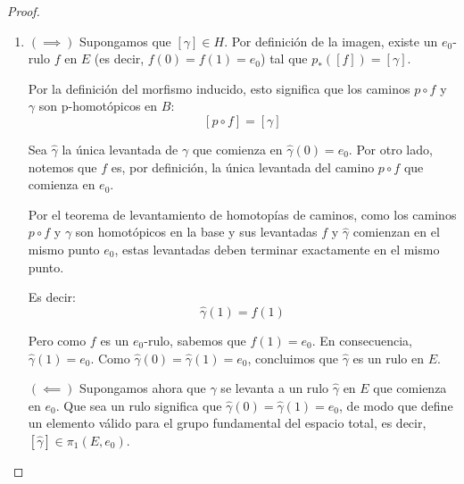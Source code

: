 \documentclass{article}
\theoremstyle{plain}
\theoremstyle{definition}
\begin{document}
\begin{proof}
\begin{enumerate}
              Finalmente, analicemos qué ocurre en el tiempo \( s=1 \). Por construcción, tenemos que \( p(\hat{H}(t,1)) = H(t,1) = b_0 \). Esto significa que el camino \( t \mapsto \hat{H}(t,1) \) es una levantada del camino constante \( c_{b_0} \) que comienza en \( \hat{H}(0,1) = e_0 \). Por la unicidad del levantamiento de caminos, la única levantada posible es el propio rulo constante en \( e_0 \), es decir, \( \hat{H}(t,1) = c_{e_0}(t) \).

              Por lo tanto, \( \hat{H} \) es una \( p \)-homotopía en \( E \) entre \( \gamma \) y \( c_{e_0} \), lo que demuestra que:
              \[ {[\gamma]} = [c_{e_0}] \]

              Como el único elemento en el núcleo es la clase de la identidad, concluimos que \( \ker(p_*) = \{ [c_{e_0}] \} \), lo que prueba que \( p_* \) es inyectiva y, por lo tanto, un monomorfismo.

        \item \( (\implies) \) Supongamos que \( [\gamma] \in H \). Por definición de la imagen, existe un \( e_0 \)-rulo \( f \) en \( E \) (es decir, \( f(0)=f(1)=e_0 \)) tal que \( p_*([f]) = [\gamma] \).

              Por la definición del morfismo inducido, esto significa que los caminos \( p \circ f \) y \( \gamma \) son p-homotópicos en \( B \):
              \[ {[p \circ f]} = [\gamma] \]

              Sea \( \hat{\gamma} \) la única levantada de \( \gamma \) que comienza en \( \hat{\gamma}(0) = e_0 \).
              Por otro lado, notemos que \( f \) es, por definición, la única levantada del camino \( p \circ f \) que comienza en \( e_0 \).

              Por el teorema de levantamiento de homotopías de caminos, como los caminos \( p \circ f \) y \( \gamma \) son homotópicos en la base y sus levantadas \( f \) y \( \hat{\gamma} \) comienzan en el mismo punto \( e_0 \), estas levantadas deben terminar exactamente en el mismo punto.

              Es decir:
              \[ \hat{\gamma}(1) = f(1) \]

              Pero como \( f \) es un \( e_0 \)-rulo, sabemos que \( f(1) = e_0 \). En consecuencia, \( \hat{\gamma}(1) = e_0 \).
              Como \( \hat{\gamma}(0) = \hat{\gamma}(1) = e_0 \), concluimos que \( \hat{\gamma} \) es un rulo en \( E \).

              \vspace{0.5cm}
              \( (\impliedby) \) Supongamos ahora que \( \gamma \) se levanta a un rulo \( \hat{\gamma} \) en \( E \) que comienza en \( e_0 \). Que sea un rulo significa que \( \hat{\gamma}(0) = \hat{\gamma}(1) = e_0 \), de modo que define un elemento válido para el grupo fundamental del espacio total, es decir, \( [\hat{\gamma}] \in \pi_1(E, e_0) \).


\end{enumerate}
\end{proof}
\end{document}
